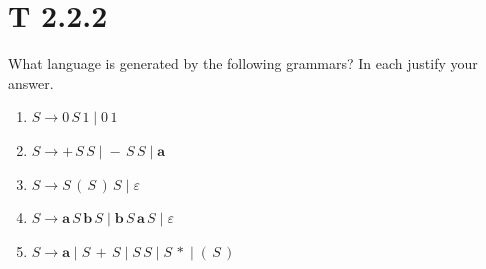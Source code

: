 \documentclass[scheme=plain,12pt]{ctexart}
\begin{document}
    \section{T 2.2.2}

    What language is generated by the following grammars? In each justify your answer.

    \begin{enumerate}
        \item $S \to 0\,S\,1\;|\;0\,1$
        \item $S \to +\,S\,S\;|\;-\,S\,S\;|\;\mathbf{a}$
        \item $S \to S\,(\,S\,)\,S\;|\;\varepsilon$
        \item $S \to \mathbf{a}\,S\,\mathbf{b}\,S\;|\;\mathbf{b}\,S\,\mathbf{a}\,S\;|\;\varepsilon$
        \item $S \to \mathbf{a}\;|\;S\,+\,S\;|\;S\,S\;|\;S\,*\;|\;(\,S\,)$
    \end{enumerate}
\end{document}
